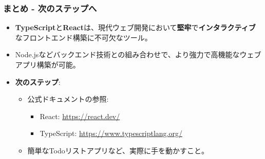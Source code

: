 \documentclass{beamer}
\begin{document}
\begin{frame}
    \frametitle{まとめ - 次のステップへ}
    \begin{itemize}
        \item \textbf{TypeScript}と\textbf{React}は、現代ウェブ開発において\textbf{堅牢}で\textbf{インタラクティブ}なフロントエンド構築に不可欠なツール。
        \item Node.jsなどバックエンド技術との組み合わせで、より強力で高機能なウェブアプリ構築が可能。
        \item \textbf{次のステップ}:
            \begin{itemize}
                \item 公式ドキュメントの参照:
                    \begin{itemize}
                        \item React: \url{https://react.dev/}
                        \item TypeScript: \url{https://www.typescriptlang.org/}
                    \end{itemize}
                \item 簡単なTodoリストアプリなど、実際に手を動かすこと。
            \end{itemize}
    \end{itemize}
    \vfill %
\end{frame}
\end{document}
